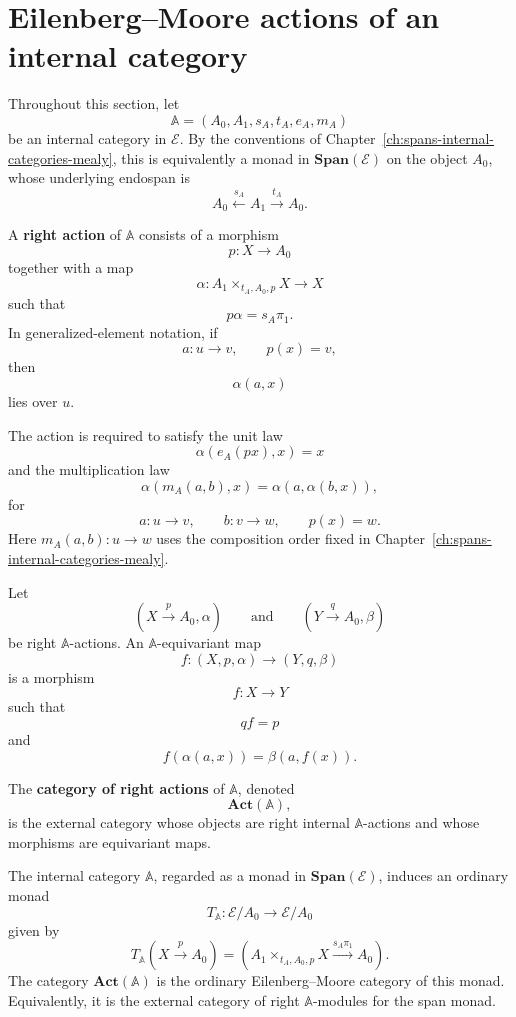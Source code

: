\section{Eilenberg--Moore actions of an internal category}
\label{sec:em-actions-internal-category}

Throughout this section, let
\[
\mathbb A=(A_0,A_1,s_A,t_A,e_A,m_A)
\]
be an internal category in \(\mathcal E\). By the conventions of
Chapter~\ref{ch:spans-internal-categories-mealy}, this is equivalently a
monad in \(\mathbf{Span}(\mathcal E)\) on the object \(A_0\), whose underlying
endospan is
\[
A_0\xleftarrow{s_A}A_1\xrightarrow{t_A}A_0.
\]

\begin{definition}
\label{def:right-internal-action-relative}
A \textbf{right action} of \(\mathbb A\) consists of a morphism
\[
p:X\to A_0
\]
together with a map
\[
\alpha:
A_1\times_{t_A,A_0,p}X\to X
\]
such that
\[
p\alpha=s_A\pi_1.
\]
In generalized-element notation, if
\[
a:u\to v,
\qquad
p(x)=v,
\]
then
\[
\alpha(a,x)
\]
lies over \(u\).

The action is required to satisfy the unit law
\[
\alpha(e_A(px),x)=x
\]
and the multiplication law
\[
\alpha(m_A(a,b),x)=\alpha(a,\alpha(b,x)),
\]
for
\[
a:u\to v,
\qquad
b:v\to w,
\qquad
p(x)=w.
\]
Here \(m_A(a,b):u\to w\) uses the composition order fixed in
Chapter~\ref{ch:spans-internal-categories-mealy}.
\end{definition}

\begin{definition}
\label{def:equivariant-map-relative}
Let
\[
(X\xrightarrow{p}A_0,\alpha)
\qquad\text{and}\qquad
(Y\xrightarrow{q}A_0,\beta)
\]
be right \(\mathbb A\)-actions. An \(\mathbb A\)-equivariant map
\[
f:(X,p,\alpha)\to(Y,q,\beta)
\]
is a morphism
\[
f:X\to Y
\]
such that
\[
qf=p
\]
and
\[
f(\alpha(a,x))=\beta(a,f(x)).
\]
\end{definition}

\begin{definition}
\label{def:act-category-relative}
The \textbf{category of right actions} of \(\mathbb A\), denoted
\[
\mathbf{Act}(\mathbb A),
\]
is the external category whose objects are right internal \(\mathbb A\)-actions
and whose morphisms are equivariant maps.
\end{definition}

\begin{proposition}
\label{prop:actions-are-em-algebras}
The internal category \(\mathbb A\), regarded as a monad in
\(\mathbf{Span}(\mathcal E)\), induces an ordinary monad
\[
T_{\mathbb A}:\mathcal E/A_0\to\mathcal E/A_0
\]
given by
\[
T_{\mathbb A}(X\xrightarrow{p}A_0)
=
\left(
A_1\times_{t_A,A_0,p}X
\xrightarrow{s_A\pi_1}
A_0
\right).
\]
The category \(\mathbf{Act}(\mathbb A)\) is the ordinary
Eilenberg--Moore category of this monad. Equivalently, it is the external
category of right \(\mathbb A\)-modules for the span monad.
\end{proposition}

